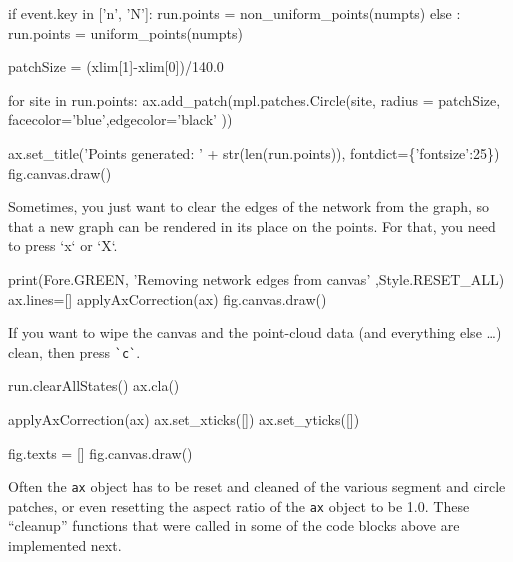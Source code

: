 if event.key in ['n', 'N']: 
        run.points = non_uniform_points(numpts)
else : 
        run.points = uniform_points(numpts)

patchSize  = (xlim[1]-xlim[0])/140.0

for site in run.points:      
    ax.add_patch(mpl.patches.Circle(site, radius = patchSize, \\
                 facecolor='blue',edgecolor='black' ))

ax.set_title('Points generated: ' + str(len(run.points)), fontdict=\{'fontsize':25\})
fig.canvas.draw()
\nwendcode{}\nwdocspar



Sometimes, you just want to clear the edges of the network from the graph, so that
a new graph can be rendered in its place on the points. For that, you need to press
`x` or `X`. 

\nwenddocs{}\endmoddef\nwstartdeflinemarkup{}\nwenddeflinemarkup
print(Fore.GREEN, 'Removing network edges from canvas' ,Style.RESET_ALL)
ax.lines=[]
applyAxCorrection(ax)
fig.canvas.draw()
\nwendcode{}\nwdocspar

If you want to wipe the canvas and the point-cloud data (and everything else \ldots) clean, 
then press \verb|`c`|. 

\nwenddocs{}\endmoddef\nwstartdeflinemarkup{}\nwenddeflinemarkup
run.clearAllStates()
ax.cla()
                                 
applyAxCorrection(ax)
ax.set_xticks([])
ax.set_yticks([])
                                    
fig.texts = []
fig.canvas.draw()
\nwendcode{}\nwdocspar





Often the \verb|ax| object has to be reset and cleaned of the various segment and circle patches, or even resetting the 
aspect ratio of the \verb|ax| object to be 1.0. These ``cleanup'' functions that were called in some of the code blocks above 
are implemented next. 

